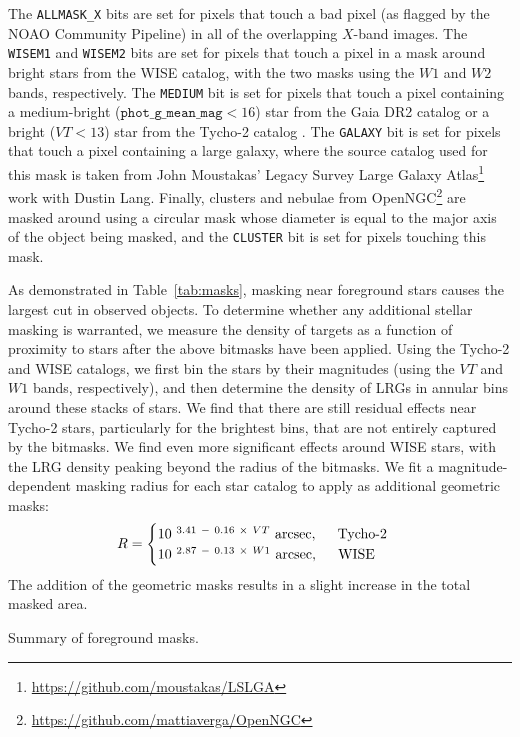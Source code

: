 The \texttt{ALLMASK\_X} bits are set for pixels that touch a bad pixel (as flagged by the NOAO Community Pipeline) in all of the overlapping $X$-band images. The \texttt{WISEM1} and \texttt{WISEM2} bits are set for pixels that touch a pixel in a mask around bright stars from the WISE catalog, with the two masks using the $W1$ and $W2$ bands, respectively. The \texttt{MEDIUM} bit is set for pixels that touch a pixel containing a medium-bright ($\texttt{phot\_g\_mean\_mag} < 16$) star from the Gaia DR2 catalog \citep{GaiaDR2} or a bright ($VT < 13$) star from the Tycho-2 catalog \citep{Hog00}. The \texttt{GALAXY} bit is set for pixels that touch a pixel containing a large galaxy, where the source catalog used for this mask is taken from John Moustakas' Legacy Survey Large Galaxy Atlas\footnote{\url{https://github.com/moustakas/LSLGA}} work with Dustin Lang. Finally, clusters and nebulae from OpenNGC\footnote{\url{https://github.com/mattiaverga/OpenNGC}} are masked around using a circular mask whose diameter is equal to the major axis of the object being masked, and the \texttt{CLUSTER} bit is set for pixels touching this mask.

As demonstrated in Table~\ref{tab:masks}, masking near foreground stars causes the largest cut in observed objects. To determine whether any additional stellar masking is warranted, we measure the density of targets as a function of proximity to stars after the above bitmasks have been applied. Using the Tycho-2 and WISE catalogs, we first bin the stars by their magnitudes (using the $VT$ and $W1$ bands, respectively), and then determine the density of LRGs in annular bins around these stacks of stars. We find that there are still residual effects near Tycho-2 stars, particularly for the brightest bins, that are not entirely captured by the bitmasks. We find even more significant effects around WISE stars, with the LRG density peaking beyond the radius of the bitmasks. We fit a magnitude-dependent masking radius for each star catalog to apply as additional geometric masks: 
%
\begin{align}\label{eq:mr-veto}
R = 
\begin{cases}
    10^{\ 3.41 \ - \ 0.16 \ \times \ VT} \ \text{arcsec}, \hspace{0.5cm} \text{Tycho-2} \\
    10^{\ 2.87 \ - \ 0.13 \ \times \ W1} \ \text{arcsec}, 
    \hspace{0.5cm} \text{WISE}
\end{cases}
\end{align}
%
The addition of the geometric masks results in a slight increase in the total masked area.
%
\begin{table}
    
    \caption{Summary of foreground masks.}
    \label{tab:masks}
\end{table}


